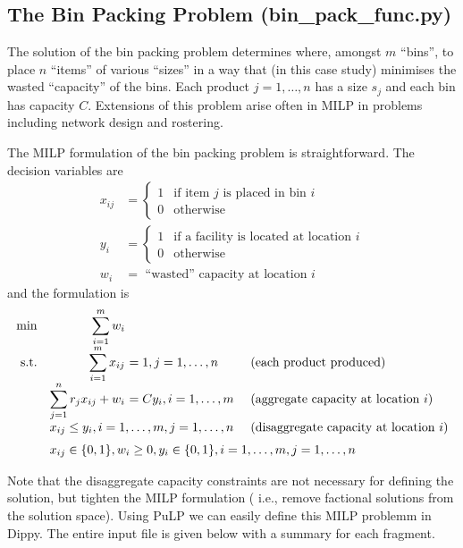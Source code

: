\subsection{The Bin Packing Problem (bin\_pack\_func.py)} \label{sbs:binpack}

The solution of the bin packing problem determines where, amongst $m$ ``bins'', to place $n$ ``items'' of various ``sizes'' in a way that (in this case study) minimises the wasted ``capacity'' of the bins. Each product $j=1, \ldots, n$ has a size $s_j$ and each bin has capacity $C$. Extensions of this problem arise often in \ac{MILP} in problems including network design and rostering.

The \ac{MILP} formulation of the bin packing problem is straightforward. The decision variables are
\begin{align*}
x_{ij} &= \begin{cases} 1 & \text{if item $j$ is placed in bin $i$} \\
0 & \text{otherwise} \end{cases} \\
y_i &= \begin{cases} 1 & \text{if a facility is located at location $i$} \\
0 & \text{otherwise} \end{cases} \\
w_i &= \text{ ``wasted'' capacity at location $i$}
\end{align*}
and the formulation is
\[
\begin{array}{rr@{\ }ll}
       \min & \displaystyle \sum_{i=1}^m w_i \\
\text{s.t.} & \displaystyle \sum_{i=1}^m x_{ij}           & = 1, j = 1, \ldots, n      & \text{ (each product produced)} \\
            & \displaystyle \sum_{j=1}^n r_j x_{ij} + w_i & = C y_i, i = 1, \ldots, m  & \text{ (aggregate capacity at location $i$)} \\
            & \multicolumn{2}{l}{x_{ij} \leq y_i, i = 1, \ldots, m, j = 1, \ldots, n}  & \text{ (disaggregate capacity at location $i$)} \\[6pt]
            & \multicolumn{3}{l}{x_{ij} \in \{ 0, 1\}, w_i \geq 0, y_i \in \{0, 1\}, i = 1, \ldots, m, j = 1, \ldots, n}
\end{array}
\]

Note that the disaggregate capacity constraints are not necessary for defining the solution, but tighten the \ac{MILP} formulation ( i.e., remove factional solutions from the solution space). Using PuLP we can easily define this \ac{MILP} problemm in Dippy. The entire input file is given below with a summary for each fragment.

